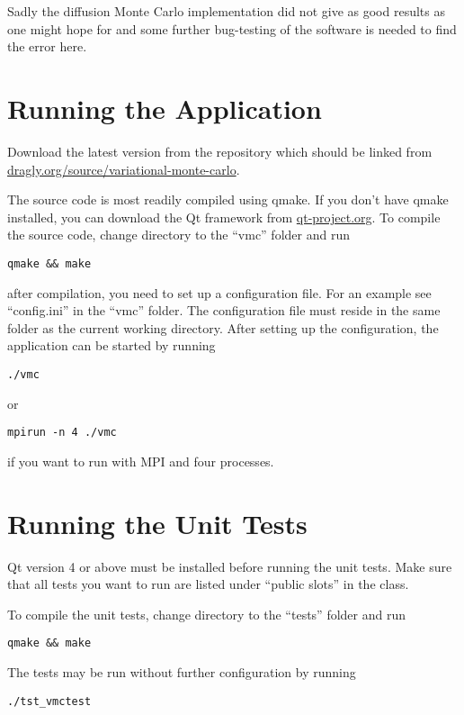 \documentclass[aps,prb,twocolumn,floatfix]{revtex4}
\newcommand{\class}[1]{{\sffamily{#1}}}
\begin{document}
Sadly the diffusion Monte Carlo implementation did not give as good results as one might hope for and some further bug-testing of the software is needed to find the error here.

\appendix

\section{Running the Application} \label{sec:runapplication}

Download the latest version from the repository which should be linked from \href{http://dragly.org/source/variational-monte-carlo/}{dragly.org/source/variational-monte-carlo}.

The source code is most readily compiled using qmake. If you don't have qmake installed, you can download the Qt framework from \href{http://qt-project.org/}{qt-project.org}. To compile the source code, change directory to the ``vmc'' folder and run
\begin{lstlisting}
qmake && make
\end{lstlisting}
after compilation, you need to set up a configuration file. For an example see ``config.ini'' in the ``vmc'' folder. The configuration file must reside in the same folder as the current working directory. After setting up the configuration, the application can be started by running
\begin{lstlisting}
./vmc
\end{lstlisting}
or
\begin{lstlisting}
mpirun -n 4 ./vmc
\end{lstlisting}
if you want to run with MPI and four processes.

\section{Running the Unit Tests} \label{sec:runtesting}

Qt version 4 or above must be installed before running the unit tests. Make sure that all tests you want to run are listed under ``public slots'' in the \class{VmcTests} class.

To compile the unit tests, change directory to the ``tests'' folder and run
\begin{lstlisting}
qmake && make
\end{lstlisting}
The tests may be run without further configuration by running
\begin{lstlisting}
./tst_vmctest
\end{lstlisting}
\end{document}
